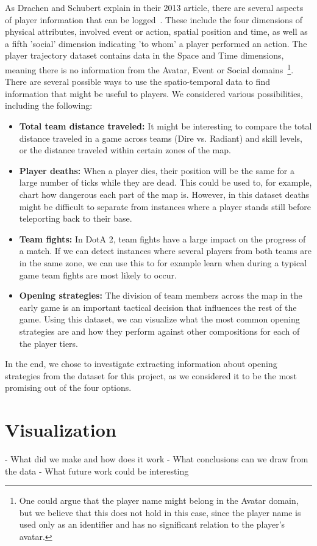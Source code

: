 \documentclass[a4paper,11pt]{article}
\begin{document}
As Drachen and Schubert explain in their 2013 article, there are several aspects of player information that can be logged~\cite{drachen2013spatial}. These include the four dimensions of physical attributes, involved event or action, spatial position and time, as well as a fifth 'social' dimension indicating 'to whom' a player performed an action.
The player trajectory dataset contains data in the Space and Time dimensions, meaning there is no information from the Avatar, Event or Social domains~\footnote{One could argue that the player name might belong in the Avatar domain, but we believe that this does not hold in this case, since the player name is used only as an identifier and has no significant relation to the player's avatar.}. There are several possible ways to use the spatio-temporal data to find information that might be useful to players. We considered various possibilities, including the following:

\begin{itemize}
\item \textbf{Total team distance traveled:} It might be interesting to compare the total distance traveled in a game across teams (Dire vs. Radiant) and skill levels, or the distance traveled within certain zones of the map.
\item \textbf{Player deaths:} When a player dies, their position will be the same for a large number of ticks while they are dead. This could be used to, for example, chart how dangerous each part of the map is. However, in this dataset deaths might be difficult to separate from instances where a player stands still before teleporting back to their base.
\item \textbf{Team fights:} In DotA 2, team fights have a large impact on the progress of a match. If we can detect instances where several players from both teams are in the same zone, we can use this to for example learn when during a typical game team fights are most likely to occur.
\item \textbf{Opening strategies:} The division of team members across the map in the early game is an important tactical decision that influences the rest of the game. Using this dataset, we can visualize what the most common opening strategies are and how they perform against other compositions for each of the player tiers.
\end{itemize}
In the end, we chose to investigate extracting information about opening strategies from the dataset for this project, as we considered it to be the most promising out of the four options.

\section{Visualization}
- What did we make and how does it work
- What conclusions can we draw from the data
- What future work could be interesting



  
\end{document}
